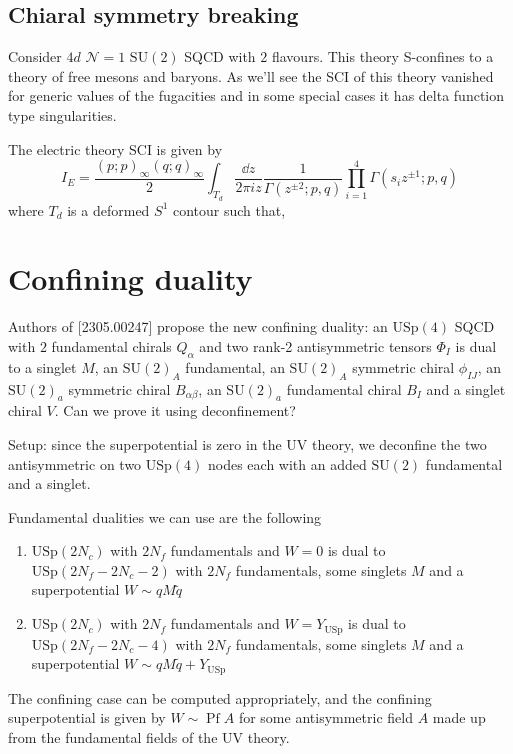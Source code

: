 \documentclass[11pt]{article}
\theoremstyle{definition}
\numberwithin{equation}{section}
\newcommand*\cN{\mathcal{N}}
\newcommand*\SU{\mathrm{SU}}
\newcommand*\USp{\mathrm{USp}}
\begin{document}
\subsection{Chiaral symmetry breaking}
Consider $4d$ $\cN=1$ $\SU(2)$ SQCD with $2$ flavours. This theory S-confines to a theory of free mesons and baryons. As we'll see the SCI of this theory vanished for generic values of the fugacities and in some special cases it has delta function type singularities.

The electric theory SCI is given by
\begin{equation}
	I_{E}=\frac{(p;p)_{\infty}(q;q)_{\infty}}{2}\int_{T_{d}}\frac{\dd{z}}{2\pi i z}\frac{1}{\Gamma(z^{\pm2};p,q)}\prod_{i=1}^{4}\Gamma( s_{i}z^{\pm 1};p,q)
\end{equation}
where $T_{d}$ is a deformed $S^{1}$ contour such that, 

\section{Confining duality}
Authors of [2305.00247] propose the new confining duality: an $\USp(4)$ SQCD with $2$ fundamental chirals $Q_{\alpha}$ and two rank-2 antisymmetric tensors $\Phi_{I}$ is dual to a singlet $M$, an $\SU(2)_{A}$ fundamental, an $\SU(2)_{A}$ symmetric chiral $\phi_{IJ}$, an $\SU(2)_{a}$ symmetric chiral $B_{\alpha\beta}$, an $\SU(2)_{a}$ fundamental chiral $B_{I}$ and a singlet chiral $V$. Can we prove it using deconfinement?

Setup: since the superpotential is zero in the UV theory, we deconfine the two antisymmetric on two $\USp(4)$ nodes each with an added $\SU(2)$ fundamental and a singlet. 

Fundamental dualities we can use are the following
\begin{enumerate}
	\item $\USp(2N_{c})$ with $2N_{f}$ fundamentals and $W=0$ is dual to $\USp(2N_{f}-2N_{c}-2)$ with $2N_{f}$ fundamentals, some singlets $M$ and a superpotential $W\sim qM\tilde{q}$
	\item$\USp(2N_{c})$ with $2N_{f}$ fundamentals and $W=Y_{\USp}$ is dual to $\USp(2N_{f}-2N_{c}-4)$ with $2N_{f}$ fundamentals, some singlets $M$ and a superpotential $W\sim qM\tilde{q}+Y_{\USp}$
\end{enumerate}

The confining case can be computed appropriately, and the confining superpotential is given by $W\sim \operatorname{Pf} A$ for some antisymmetric field $A$ made up from the fundamental fields of the UV theory.



{}

\end{document}
